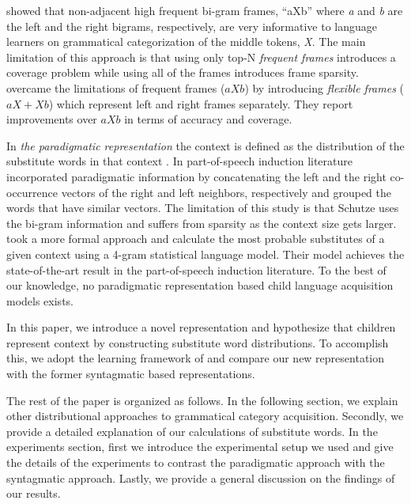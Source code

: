\cite{Mintz200391} showed that non-adjacent high frequent bi-gram frames,
``aXb'' where {\it a} and {\it b} are the left and the right bigrams,
respectively, are very informative to language learners on grammatical
categorization of the middle tokens, {\it X}.  The main limitation of this
approach is that using only top-N {\it frequent frames} introduces a coverage
problem while using all of the frames introduces frame sparsity.
\cite{clair2010} overcame the limitations of frequent frames ($aXb$) by
introducing {\it flexible frames} ($aX+Xb$) which represent left and right
frames separately.  They report improvements over $aXb$ in terms of accuracy
and coverage.  

In {\em the paradigmatic representation} the context is defined as the distribution
of the substitute words in that context \citep*{SchutzePe93, Schutze1995,
YatbazSY12}.   In part-of-speech induction literature \cite{Schutze1995}
incorporated paradigmatic information by concatenating the left and the right
co-occurrence vectors of the right and left neighbors, respectively and grouped
the words that have similar vectors.  The limitation of this study is that Schutze
uses the bi-gram information and suffers from sparsity as the context
size gets larger.  \cite{YatbazSY12} took a more formal approach and
calculate the most probable substitutes of a given context using a 4-gram
statistical language model.  Their model achieves the state-of-the-art result
in the part-of-speech induction literature.  To the best of our knowledge,
no paradigmatic representation based child language acquisition
models exists.  

In this paper, we introduce a novel representation and hypothesize that
children represent context by constructing substitute word distributions.  To
accomplish this, we adopt the learning framework of \citep*{clair2010} and
compare our new representation with the former syntagmatic based
representations. 

The rest of the paper is organized as follows. In the following section, we explain other
distributional approaches to grammatical category acquisition. Secondly, we provide
a detailed explanation of our calculations of substitute words. In the experiments section,
first we introduce the experimental setup we used and give the details of the experiments
to contrast the paradigmatic approach with the syntagmatic approach. Lastly, we provide a
general discussion on the findings of our results. 
